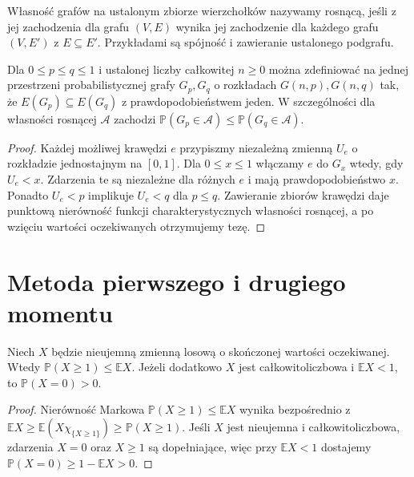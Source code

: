 \begin{definicja}
\label{def:tg-random-increasing}
Własność grafów na ustalonym zbiorze wierzchołków
nazywamy rosnącą, jeśli z jej zachodzenia dla grafu
$(V,E)$ wynika jej zachodzenie dla każdego grafu
$(V,E')$ z $E\subseteq E'$. Przykładami są spójność
i zawieranie ustalonego podgrafu.
\end{definicja}

\begin{stwierdzenie}
\label{prop:tg-random-coupling}
Dla $0\leq p\leq q\leq1$ i ustalonej liczby całkowitej $n\geq0$
można zdefiniować na jednej przestrzeni
probabilistycznej grafy $G_p,G_q$ o rozkładach
$G(n,p),G(n,q)$ tak, że $E(G_p)\subseteq E(G_q)$
z prawdopodobieństwem jeden. W szczególności
dla własności rosnącej $\mathcal A$ zachodzi
$\mathbb P(G_p\in\mathcal A)\leq\mathbb P(G_q\in\mathcal A)$.
\end{stwierdzenie}
\begin{proof}
Każdej możliwej krawędzi $e$ przypiszmy niezależną
zmienną $U_e$ o rozkładzie jednostajnym na $[0,1]$.
Dla $0\leq x\leq1$ włączamy $e$ do $G_x$ wtedy,
gdy $U_e<x$. Zdarzenia te są niezależne
dla różnych $e$ i mają prawdopodobieństwo $x$.
Ponadto $U_e<p$ implikuje $U_e<q$ dla $p\leq q$.
Zawieranie zbiorów krawędzi daje punktową
nierówność funkcji charakterystycznych
własności rosnącej, a po wzięciu wartości
oczekiwanych otrzymujemy tezę.
\end{proof}

\section{Metoda pierwszego i drugiego momentu}
\label{sec:tg-random-moments}

\begin{lemat}
\label{lem:tg-random-first-moment}
Niech $X$ będzie nieujemną
zmienną losową o skończonej
wartości oczekiwanej.
Wtedy
$\mathbb P(X\geq1)\leq\mathbb EX$.
Jeżeli dodatkowo $X$ jest
całkowitoliczbowa i
$\mathbb EX<1$, to
$\mathbb P(X=0)>0$.
\end{lemat}
\begin{proof}
Nierówność Markowa
$\mathbb P(X\geq1)\leq\mathbb EX$
wynika bezpośrednio
z $\mathbb EX\geq
\mathbb E(X\chi_{\{X\geq1\}})
\geq\mathbb P(X\geq1)$.
Jeśli $X$ jest nieujemna
i całkowitoliczbowa,
zdarzenia $X=0$ oraz
$X\geq1$ są dopełniające,
więc przy $\mathbb EX<1$
dostajemy
$\mathbb P(X=0)\geq1-\mathbb EX>0$.
\end{proof}

